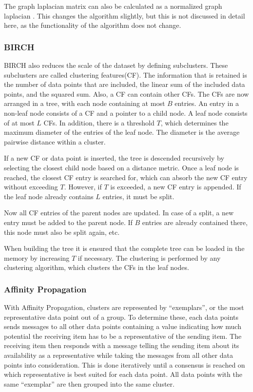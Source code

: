 The graph laplacian matrix can also be calculated as a normalized graph laplacian \cite{spectral_clustering}.
This changes the algorithm slightly, but this is not discussed in detail here, as the functionality of the algorithm does not change.

\subsubsection{BIRCH}
BIRCH also reduces the scale of the dataset by defining subclusters.
These subclusters are called clustering features(CF).
The information that is retained is the number of data points that are included, the linear sum of the included data points, and the squared sum.
Also, a CF can contain other CFs.
The CFs are now arranged in a tree, with each node containing at most $B$ entries.
An entry in a non-leaf node consists of a CF and a pointer to a child node.
A leaf node consists of at most $L$ CFs.
In addition, there is a threshold $T$, which determines the maximum diameter of the entries of the leaf node.
The diameter is the average pairwise distance within a cluster.

If a new CF or data point is inserted, the tree is descended recursively by selecting the closest child node based on a distance metric.
Once a leaf node is reached, the closest CF entry is searched for, which can absorb the new CF entry without exceeding $T$.
However, if $T$ is exceeded, a new CF entry is appended.
If the leaf node already contains $L$ entries, it must be split.

Now all CF entries of the parent nodes are updated.
In case of a split, a new entry must be added to the parent node.
If $B$ entries are already contained there, this node must also be split again, etc.

When building the tree it is ensured that the complete tree can be loaded in the memory by increasing $T$ if necessary.
The clustering is performed by any clustering algorithm, which clusters the CFs in the leaf nodes.\cite{birch}

\subsubsection{Affinity Propagation}
With Affinity Propagation, clusters are represented by ``exemplars'', or the most representative data point out of a group. To determine these, each data points sends messages to all other data points containing a value indicating how much potential the receiving item has to be a representative of the sending item. The receiving item then responds with a message telling the sending item about its availability as a representative while taking the messages from all other data points into consideration. This is done iteratively until a consensus is reached on which representative is best suited for each data point. All data points with the same ``exemplar'' are then grouped into the same cluster.\cite{affinity_propagation}

